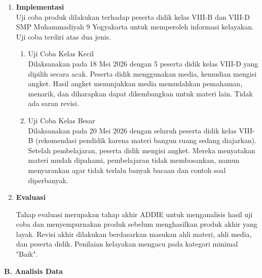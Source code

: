 \begin{enumerate}[leftmargin=1cm, label=\arabic*.]
\begin{enumerate}[label=\arabic*)]
        \hspace*{1cm}Tidak ada revisi signifikan; hanya kunci jawaban yang salah telah diperbaiki. Bapak Wibowo menyatakan bahwa media memiliki visual baik dan ilustrasi yang mempermudah pemahaman.
    \end{enumerate}

    \item \textbf{Implementasi}\\
    \hspace*{1cm}Uji coba produk dilakukan terhadap peserta didik kelas VIII-B dan VIII-D SMP Muhammadiyah 9 Yogyakarta untuk memperoleh informasi kelayakan. Uji coba terdiri atas dua jenis.
    \begin{enumerate}
        \item Uji Coba Kelas Kecil \\
        \hspace*{1cm}Dilaksanakan pada 18 Mei 2026 dengan 5 peserta didik kelas VIII-D yang dipilih secara acak. Peserta didik menggunakan media, kemudian mengisi angket. Hasil angket menunjukkan media memudahkan pemahaman, menarik, dan diharapkan dapat dikembangkan untuk materi lain. Tidak ada saran revisi.

        \item Uji Coba Kelas Besar \\
        \hspace*{1cm}Dilaksanakan pada 20 Mei 2026 dengan seluruh peserta didik kelas VIII-B (rekomendasi pendidik karena materi bangun ruang sedang diajarkan). Setelah pembelajaran, peserta didik mengisi angket. Mereka menyatakan materi mudah dipahami, pembelajaran tidak membosankan, namun menyarankan agar tidak terlalu banyak bacaan dan contoh soal diperbanyak.
    \end{enumerate}

    \item \textbf{Evaluasi}
    
    \hspace{1cm}Tahap evaluasi merupakan tahap akhir ADDIE untuk menganalisis hasil uji coba dan menyempurnakan produk sebelum menghasilkan produk akhir yang layak. Revisi akhir dilakukan berdasarkan masukan ahli materi, ahli media, dan peserta didik. Penilaian kelayakan mengacu pada kategori minimal "Baik".

\end{enumerate}

\textbf{B. Analisis Data}

